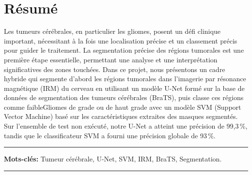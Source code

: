 \chapter*{\hfill Résumé \hfill}

Les tumeurs cérébrales, en particulier les gliomes, posent un défi clinique important, nécessitant à la fois une localisation précise et un classement précis pour guider le traitement. La segmentation précise des régions tumorales est une première étape essentielle, permettant une analyse et une interprétation significatives des zones touchées. Dans ce projet, nous présentons un cadre hybride qui segmente d’abord les régions tumorales dans l’imagerie par résonance magnétique (IRM) du cerveau en utilisant un modèle U-Net formé sur la base de données de segmentation des tumeurs cérébrales (BraTS), puis classe ces régions comme faibleGliomes de grade ou de haut grade avec un modèle SVM (Support Vector Machine) basé sur les caractéristiques extraites des masques segmentés. Sur l’ensemble de test non exécuté, notre U-Net a atteint une précision de 99,3\,\%, tandis que le classificateur SVM a fourni une précision globale de 93\,\%.


\noindent\rule{\textwidth}{0.2pt}
\textbf{Mots-clés:} Tumeur cérébrale, U-Net, SVM, IRM, BraTS, Segmentation.\\
\noindent\rule{\textwidth}{0.2pt}
